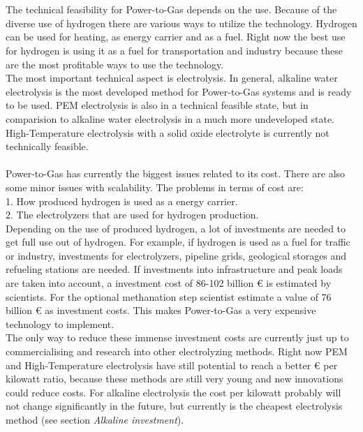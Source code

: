 \begin{parcolumns}[colwidths={1=2.5 cm, 2=10 cm, 3=2.5 cm}]{3}
{\\ \\
The technical feasibility for Power-to-Gas depends on the use. Because of the diverse use of hydrogen there are various ways to utilize the technology. Hydrogen can be used for heating, as energy carrier and as a fuel. Right now the best use for hydrogen is using it as a fuel for transportation and industry because these are the most profitable ways to use the technology. \\
The most important technical aspect is electrolysis. In general, alkaline water electrolysis is the most developed method for Power-to-Gas systems and is ready to be used. PEM electrolysis is also in a technical feasible state, but in comparision to alkaline water electrolysis in a much more undeveloped state. High-Temperature electrolysis with a solid oxide electrolyte is currently not technically feasible. 
\\ \\ 
Power-to-Gas has currently the biggest issues related to its cost. There are also some minor issues with scalability. The problems in terms of cost are: \\ 
1. How produced hydrogen is used as a energy carrier. \\
2. The electrolyzers that are used for hydrogen production. \\
Depending on the use of produced hydrogen, a lot of investments are needed to get full use out of hydrogen. For example, if hydrogen is used as a fuel for traffic or industry, investments for electrolyzers, pipeline grids, geological storages and refueling stations are needed.
If investments into infrastructure and peak loads are taken into account, a investment cost of 86-102 billion \euro{ } is estimated by scientists. 
For the optional methanation step scientist estimate a value of 76 billion \euro{ } as investment costs.
This makes Power-to-Gas a very expensive technology to implement.\\
The only way to reduce these immense investment costs are currently just up to commercialising and research into other electrolyzing methods. Right now PEM and High-Temperature electrolysis have still potential to reach a better \euro{ } per kilowatt ratio, because these methods are still very young and new innovations could reduce costs. For alkaline electrolysis the cost per kilowatt probably will not change significantly in the future, but currently is the cheapest electrolysis method (see section \textit{Alkaline investment}).\\
}
\end{parcolumns}
